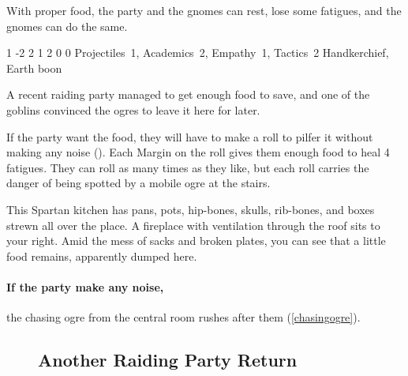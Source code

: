 \begin{multicols}{2}
With proper food, the party and the gnomes can rest, lose some \glspl{fatigue}, and the gnomes can do the same.




{1}%
{-2}%
{{2}%
{1}%
{2}}%
{0}%
{0}%
{Projectiles~1, Academics~2, Empathy~1, Tactics~2}%
{Handkerchief, Earth \gls{boon}}%
{
  \setcounter{Fate}{2}
  \setcounter{Water}{3}
  \setcounter{Earth}{1}
  \setcounter{fp}{3}
}


\begin{exampletext}
  A recent raiding party managed to get enough food to save, and one of the goblins convinced the ogres to leave it here for later.
\end{exampletext}

If the party want the food, they will have to make a  roll to pilfer it without making any noise (\tn[8]).
Each Margin on the roll gives them enough food to heal 4 \glspl{fatigue}.
They can roll as many times as they like, but each roll carries the danger of being spotted by a mobile ogre at the stairs.

\begin{boxtext}
  This Spartan kitchen has pans, pots, hip-bones, skulls, rib-bones, and boxes strewn all over the place.
  A fireplace with ventilation through the roof sits to your right.
  Amid the mess of sacks and broken plates, you can see that a little food remains, apparently dumped here.
\end{boxtext}

\paragraph{If the party make any noise,}
the chasing ogre from the central room rushes after them (\vref{chasingogre}).

\begin{figure*}[b!]

\setcounter{enc}{\value{list}}
\subsection{Another Raiding Party Return}
\setcounter{list}{\value{enc}}


\end{figure*}
\end{multicols}
